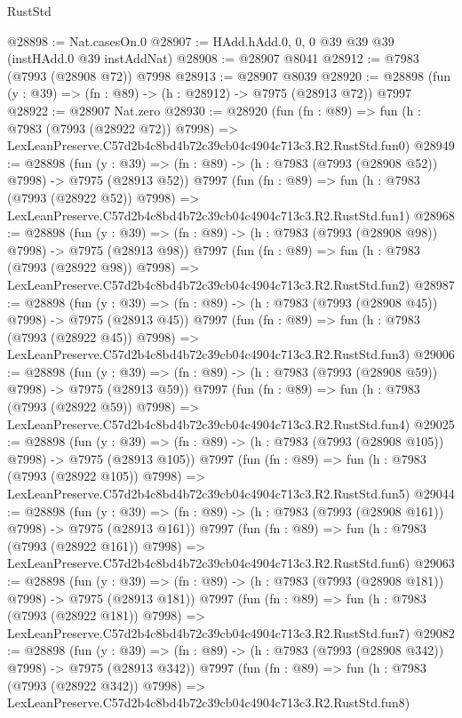 \begin{lexlean}{RustStd}
\begin{coremodule}
@28898 := Nat.casesOn.{0}
@28907 := HAdd.hAdd.{0, 0, 0} @39 @39 @39 (instHAdd.{0} @39 instAddNat)
@28908 := @28907 @8041
@28912 := @7983 (@7993 (@28908 @72)) @7998
@28913 := @28907 @8039
@28920 := @28898 (fun (y : @39) => (fn : @89) -> (h : @28912) -> @7975 (@28913 @72)) @7997
@28922 := @28907 Nat.zero
@28930 := @28920
    (fun (fn : @89) =>
    fun (h : @7983 (@7993 (@28922 @72)) @7998) =>
    LexLeanPreserve.C57d2b4c8bd4b72c39cb04c4904c713c3.R2.RustStd.fun0)
@28949 := @28898
    (fun (y : @39) => (fn : @89) -> (h : @7983 (@7993 (@28908 @52)) @7998) -> @7975 (@28913 @52))
    @7997
    (fun (fn : @89) =>
    fun (h : @7983 (@7993 (@28922 @52)) @7998) =>
    LexLeanPreserve.C57d2b4c8bd4b72c39cb04c4904c713c3.R2.RustStd.fun1)
@28968 := @28898
    (fun (y : @39) => (fn : @89) -> (h : @7983 (@7993 (@28908 @98)) @7998) -> @7975 (@28913 @98))
    @7997
    (fun (fn : @89) =>
    fun (h : @7983 (@7993 (@28922 @98)) @7998) =>
    LexLeanPreserve.C57d2b4c8bd4b72c39cb04c4904c713c3.R2.RustStd.fun2)
@28987 := @28898
    (fun (y : @39) => (fn : @89) -> (h : @7983 (@7993 (@28908 @45)) @7998) -> @7975 (@28913 @45))
    @7997
    (fun (fn : @89) =>
    fun (h : @7983 (@7993 (@28922 @45)) @7998) =>
    LexLeanPreserve.C57d2b4c8bd4b72c39cb04c4904c713c3.R2.RustStd.fun3)
@29006 := @28898
    (fun (y : @39) => (fn : @89) -> (h : @7983 (@7993 (@28908 @59)) @7998) -> @7975 (@28913 @59))
    @7997
    (fun (fn : @89) =>
    fun (h : @7983 (@7993 (@28922 @59)) @7998) =>
    LexLeanPreserve.C57d2b4c8bd4b72c39cb04c4904c713c3.R2.RustStd.fun4)
@29025 := @28898
    (fun (y : @39) => (fn : @89) -> (h : @7983 (@7993 (@28908 @105)) @7998) -> @7975 (@28913 @105))
    @7997
    (fun (fn : @89) =>
    fun (h : @7983 (@7993 (@28922 @105)) @7998) =>
    LexLeanPreserve.C57d2b4c8bd4b72c39cb04c4904c713c3.R2.RustStd.fun5)
@29044 := @28898
    (fun (y : @39) => (fn : @89) -> (h : @7983 (@7993 (@28908 @161)) @7998) -> @7975 (@28913 @161))
    @7997
    (fun (fn : @89) =>
    fun (h : @7983 (@7993 (@28922 @161)) @7998) =>
    LexLeanPreserve.C57d2b4c8bd4b72c39cb04c4904c713c3.R2.RustStd.fun6)
@29063 := @28898
    (fun (y : @39) => (fn : @89) -> (h : @7983 (@7993 (@28908 @181)) @7998) -> @7975 (@28913 @181))
    @7997
    (fun (fn : @89) =>
    fun (h : @7983 (@7993 (@28922 @181)) @7998) =>
    LexLeanPreserve.C57d2b4c8bd4b72c39cb04c4904c713c3.R2.RustStd.fun7)
@29082 := @28898
    (fun (y : @39) => (fn : @89) -> (h : @7983 (@7993 (@28908 @342)) @7998) -> @7975 (@28913 @342))
    @7997
    (fun (fn : @89) =>
    fun (h : @7983 (@7993 (@28922 @342)) @7998) =>
    LexLeanPreserve.C57d2b4c8bd4b72c39cb04c4904c713c3.R2.RustStd.fun8)

\end{coremodule}
\end{lexlean}
